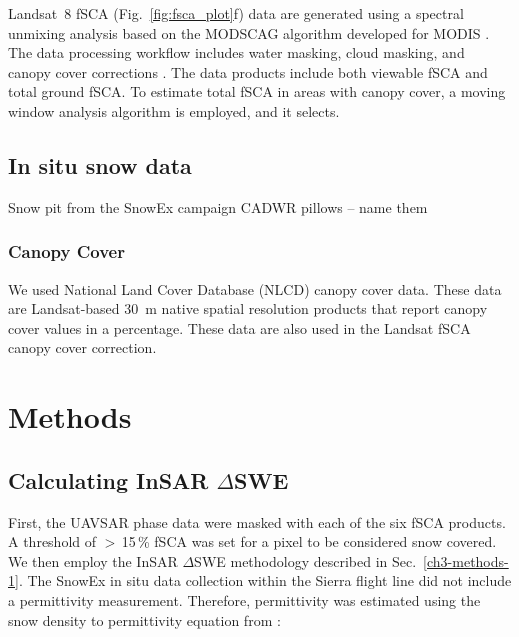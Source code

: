 Landsat~8 fSCA (Fig.~\ref{fig:fsca_plot}f) \citep{selkowitzUSGSLandsatSnow2017} data are generated using a spectral unmixing analysis based on the MODSCAG algorithm developed for MODIS \citep{painterRetrievalSubpixelSnow2009}. The data processing workflow includes water masking, cloud masking, and canopy cover corrections \citep{selkowitzUSGSLandsatSnow2017, stillingerLandsatMODISVIIRS2023}. The data products include both viewable fSCA and total ground fSCA. To estimate total fSCA in areas with canopy cover, a moving window analysis algorithm is employed, and it selects.

\hypertarget{ch4-methods-8}{\subsection{In situ snow data}\label{ch4-methods-8}}

Snow pit from the SnowEx campaign
CADWR pillows -- name them

\hypertarget{ch4-methods-9}{\subsubsection{Canopy Cover}\label{ch4-methods-9}}

We used National Land Cover Database (NLCD) \citep{homerConterminousUnitedStates2020} canopy cover data. These data are Landsat-based 30~m native spatial resolution products that report canopy cover values in a percentage. These data are also used in the Landsat fSCA canopy cover correction.


\hypertarget{ch4-methods}{\section{Methods}\label{ch4-methods}}
\hypertarget{ch4-methods-1}{\subsection{Calculating InSAR $\Delta$SWE}\label{ch4-methods-1}}


First, the UAVSAR phase data were masked with each of the six fSCA products. A threshold of $>$\,15\,\% fSCA was set for a pixel to be considered snow covered. We then employ the InSAR $\Delta$SWE methodology described in Sec.~\ref{ch3-methods-1}. The SnowEx in situ data collection within the Sierra flight line did not include a permittivity measurement. Therefore, permittivity was estimated using the snow density to permittivity equation from \cite{guneriussenInSAREstimationChanges2001}:

